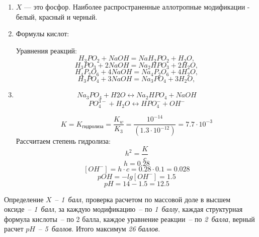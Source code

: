 \solutionSection

\begin{enumerate}
\item $X$ — это фосфор. Наиболее распространенные аллотропные модификации - белый, красный и черный.
\item Формулы кислот:


Уравнения реакций:
$$H_3PO_2 + NaOH = NaH_2PO_2 + H_2O,$$
$$H_3PO_3 + 2NaOH = Na_2HPO_3 + 2H_2O,$$
$$H_4P_2O_6 + 4NaOH = Na_4P_2O_6 + 4H_2O,$$
$$H_3PO_4 + 3NaOH = Na_3PO_4 + 3H_2O,$$
\item$$Na_3PO_4 + H2O\leftrightarrow Na_2HPO_4 + NaOH$$
$$PO_4^{3-} + H_2O\leftrightarrow HPO_4^- + OH^-$$

$$K = K_\text{гидролиза} =\frac{K_w}{K_\text{3}}=\frac{10^{-14}}{(1.3\cdot10^{-12})}=7.7\cdot10^{-3}$$
Рассчитаем степень гидролиза:
$$h^2 =\frac{K}{c}$$
$$h = 0.28$$
$$[OH^-] = h\cdot c = 0.28\cdot0.1 = 0.028$$
$$pOH = -lg[OH^-] = 1.5$$
$$pH = 14 - 1.5 = 12.5$$
\end{enumerate}

\additionalCriteria

Определение $X$~-- \textit{1~балл}, проверка расчетом по массовой доле в высшем оксиде~-- \textit{1~балл}, за каждую модификацию~-- по \textit{1~баллу}, каждая структурная формула кислоты~-- по 2 балла, каждое уравнение реакции~-- по \textit{2~балла}, верный расчет $pH$~-- \textit{5~баллов}. Итого максимум \textit{26 баллов}.